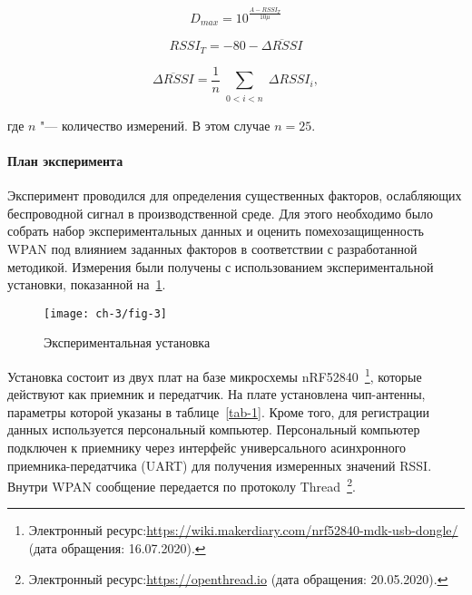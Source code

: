 \begin{equation}
	D_{max} = 10^\frac{A-RSSI_T}{10 \mu}
	\label{eq-5}
\end{equation}

\begin{equation}
	RSSI_T = -80-\overline{{\mathit \Delta} RSSI}
	\label{eq-6}
\end{equation}

\begin{equation}
	\overline{{\mathit \Delta} RSSI} = \frac1n \sum_{\substack{0 < i < n}}{\mathit\Delta} RSSI_i,
	\label{eq-7}
\end{equation}

\noindent где $n$ "--- количество измерений. В этом случае $n = 25$.

\paragraph{План эксперимента}

Эксперимент проводился для определения существенных факторов, ослабляющих беспроводной сигнал в производственной среде. Для этого необходимо было собрать набор экспериментальных данных и оценить помехозащищенность WPAN под влиянием заданных факторов в соответствии с разработанной методикой.
Измерения были получены с использованием экспериментальной установки, показанной на~\cref{ch-3/fig-3}.

\begin{figure} [ht]
	\centering
	\texttt{[image: ch-3/fig-3]}
	\caption{Экспериментальная установка}
	\label{ch-3/fig-3}
\end{figure}

Установка состоит из двух плат на базе микросхемы nRF52840~\footnote{Электронный ресурс:{\tiny\url{https://wiki.makerdiary.com/nrf52840-mdk-usb-dongle/} (дата обращения: 16.07.2020)}.}, которые действуют как приемник и передатчик. На плате установлена чип-антенны, параметры которой указаны в таблице~\cref{tab-1}. Кроме того, для регистрации данных используется персональный компьютер. Персональный компьютер подключен к приемнику через интерфейс универсального асинхронного приемника-передатчика (UART) для получения измеренных значений RSSI. Внутри WPAN сообщение передается по протоколу Thread~\footnote{Электронный ресурс:{\tiny\url{https://openthread.io}} (дата обращения: 20.05.2020).}.

